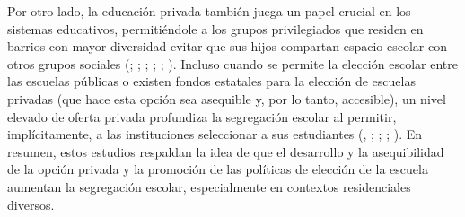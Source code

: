 \documentclass[
  spanish,
  a4paper,%
  chapterprefix=true,%
  DIV=calc,%
  twoside]{scrbook}%
\begin{document}
Por otro lado, la educación privada también
juega un papel crucial en los sistemas educativos, permitiéndole a los
grupos privilegiados que residen en barrios con mayor diversidad evitar
que sus hijos compartan espacio escolar con otros grupos sociales
(; ; ; ; ; ). Incluso cuando se permite la elección escolar entre las
escuelas públicas o existen fondos estatales para la elección de
escuelas privadas (que hace esta opción sea asequible y, por lo tanto,
accesible), un nivel elevado de oferta privada profundiza la segregación
escolar al permitir, implícitamente, a las instituciones seleccionar a
sus estudiantes (, ; ; ; ). En resumen, estos estudios respaldan la idea de que el
desarrollo y la asequibilidad de la opción privada y la promoción de las
políticas de elección de la escuela aumentan la segregación escolar,
especialmente en contextos residenciales diversos.
\end{document}
